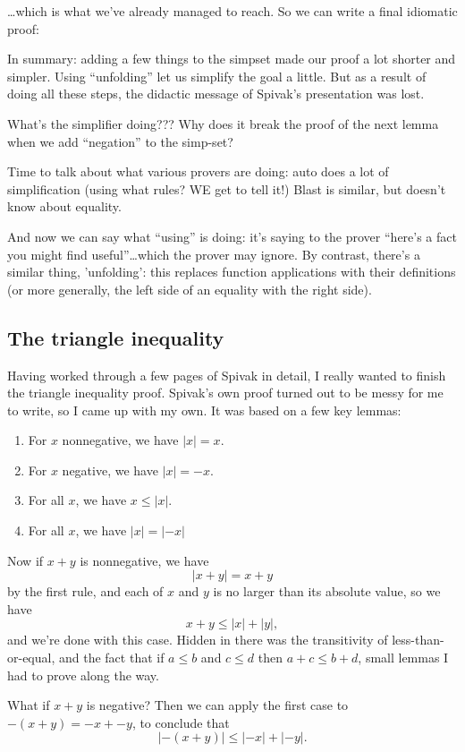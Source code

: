 \ldots which is what we've already managed to reach. So we can write a final idiomatic proof:

In summary: adding a few things to the simpset made our proof a lot shorter and simpler. Using ``unfolding'' let us simplify the goal a little. But as a result of doing all these steps, the didactic message of Spivak's presentation was lost. 


What's the simplifier doing???
Why does it break the proof of the next lemma when we add ``negation'' to the simp-set? 

Time to talk about what various provers are doing: auto does a lot of simplification (using what rules? WE get to tell it!) Blast is similar, but doesn't know about equality. 

And now we can say what ``using'' is doing: it's saying to the prover ``here's a fact you might find useful''\ldots which the prover may ignore. By contrast, there's a similar thing, 'unfolding': this replaces function applications with their definitions (or more generally, the left side of an equality with the right side). 

\subsection{The triangle inequality}
Having worked through a few pages of Spivak in detail, I really wanted to finish the triangle inequality proof. Spivak's own proof turned out to be messy for me to write, so I came up with my own. It was based on a few key lemmas: 
\begin{enumerate}
    \item For $x$ nonnegative, we have $|x| = x$.
    \item For $x$ negative, we have $|x| = -x$.
    \item For all $x$, we have $x \le |x|$.
    \item For all $x$, we have $|x| = |-x|$
\end{enumerate}
Now if $x+y$ is nonnegative, we have
$$
|x+y| = x + y
$$
by the first rule, and each of $x$ and $y$ is no larger than its absolute value, so we have $$
x + y \le |x| + |y|,$$
and we're done with this case. Hidden in there was the transitivity of less-than-or-equal, and the fact that if $a \le b$ and $c \le d$ then $a + c \le b + d$, small lemmas I had to prove along the way. 

What if $x + y$ is negative? Then we can apply the first case to $-(x+y) = -x + -y$, to conclude that 
$$
|-(x+y)| \le |-x| + |-y|.$$

